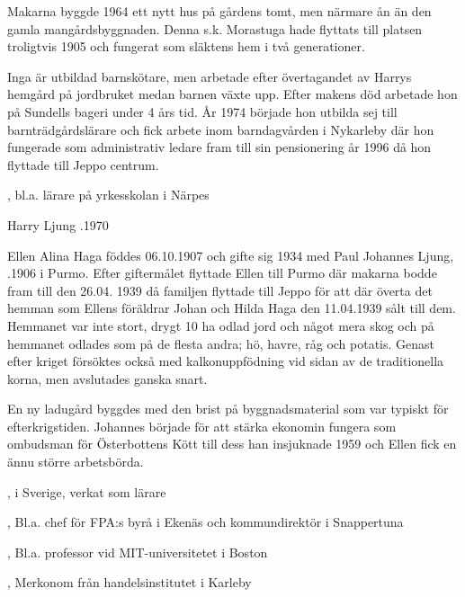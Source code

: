 Makarna byggde 1964 ett nytt hus på gårdens tomt, men närmare ån än den gamla mangårdsbyggnaden. Denna s.k. Morastuga hade flyttats till platsen troligtvis 1905 och fungerat som släktens hem i två generationer.

Inga är utbildad barnskötare, men arbetade efter övertagandet av Harrys hemgård på jordbruket medan barnen växte upp. Efter makens död arbetade hon på Sundells bageri under 4 års tid. År 1974 började hon utbilda sej till barnträdgårdslärare och fick arbete inom barndagvården i Nykarleby där hon fungerade som administrativ ledare fram till sin pensionering år 1996 då hon flyttade till Jeppo centrum.

\begin{jhchildren}
  \item {}
  \item {}, bl.a. lärare på yrkesskolan i Närpes
  \item {}
\end{jhchildren}

Harry Ljung .1970



%
Ellen Alina Haga föddes 06.10.1907 och gifte sig  1934 med Paul Johannes Ljung, .1906 i Purmo. Efter giftermålet flyttade Ellen till Purmo där makarna bodde fram till den 26.04. 1939 då familjen flyttade till Jeppo för att där överta det hemman som Ellens föräldrar Johan och Hilda Haga den 11.04.1939 sålt till dem. Hemmanet var inte stort, drygt 10 ha odlad jord och något mera skog och på hemmanet odlades som på de flesta andra; hö, havre, råg och potatis. Genast efter kriget försöktes också med kalkonuppfödning vid sidan av de traditionella korna, men avslutades ganska snart.

En ny ladugård byggdes med den brist på byggnadsmaterial som var typiskt för efterkrigstiden. Johannes började för att stärka ekonomin fungera som ombudsman för Österbottens Kött till dess han insjuknade 1959 och Ellen fick en ännu större arbetsbörda.

\begin{jhchildren}
  \item {}
  \item {}, i Sverige, verkat som lärare
  \item {}, Bl.a. chef för FPA:s byrå i Ekenäs och kommundirektör i Snappertuna
  \item {}, Bl.a. professor vid MIT-universitetet i Boston
  \item {}, Merkonom från handelsinstitutet i Karleby
\end{jhchildren}

